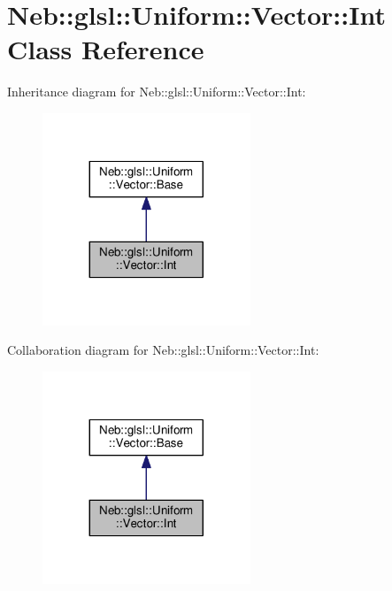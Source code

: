 \hypertarget{classNeb_1_1glsl_1_1Uniform_1_1Vector_1_1Int}{\section{Neb\-:\-:glsl\-:\-:Uniform\-:\-:Vector\-:\-:Int Class Reference}
\label{classNeb_1_1glsl_1_1Uniform_1_1Vector_1_1Int}
}


Inheritance diagram for Neb\-:\-:glsl\-:\-:Uniform\-:\-:Vector\-:\-:Int\-:
\nopagebreak
\begin{figure}[H]
\begin{center}
\leavevmode
\includegraphics[width=176pt]{classNeb_1_1glsl_1_1Uniform_1_1Vector_1_1Int__inherit__graph}
\end{center}
\end{figure}


Collaboration diagram for Neb\-:\-:glsl\-:\-:Uniform\-:\-:Vector\-:\-:Int\-:
\nopagebreak
\begin{figure}[H]
\begin{center}
\leavevmode
\includegraphics[width=176pt]{classNeb_1_1glsl_1_1Uniform_1_1Vector_1_1Int__coll__graph}
\end{center}
\end{figure}
